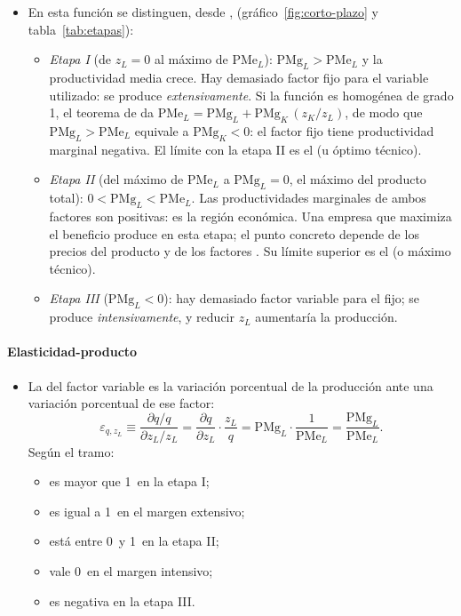 \documentclass[11pt]{article}
\begin{document}
\begin{itemize}
\item En esta función se distinguen, desde \textcite{Cassels1936Law},  (gráfico~\ref{fig:corto-plazo} y tabla~\ref{tab:etapas}):
  \begin{itemize}
  \item \emph{Etapa I} (de $z_L=0$ al máximo de $\mathrm{PMe}_L$): $\mathrm{PMg}_L>\mathrm{PMe}_L$ y la productividad media crece. Hay demasiado factor fijo para el variable utilizado: se produce \emph{extensivamente}. Si la función es homogénea de grado 1, el teorema de  da $\mathrm{PMe}_L=\mathrm{PMg}_L+\mathrm{PMg}_K\,(z_K/z_L)$, de modo que $\mathrm{PMg}_L>\mathrm{PMe}_L$ equivale a $\mathrm{PMg}_K<0$: el factor fijo tiene productividad marginal negativa. El límite con la etapa II es el  (u óptimo técnico).
  \item \emph{Etapa II} (del máximo de $\mathrm{PMe}_L$ a $\mathrm{PMg}_L=0$, el máximo del producto total): $0<\mathrm{PMg}_L<\mathrm{PMe}_L$. Las productividades marginales de ambos factores son positivas: es la región económica. Una empresa que maximiza el beneficio produce en esta etapa; el punto concreto depende de los precios del producto y de los factores  . Su límite superior es el  (o máximo técnico).
  \item \emph{Etapa III} ($\mathrm{PMg}_L<0$): hay demasiado factor variable para el fijo; se produce \emph{intensivamente}, y reducir $z_L$ aumentaría la producción.
  \end{itemize}
\end{itemize}

\paragraph{Elasticidad-producto}

\begin{itemize}
\item La  del factor variable es la variación porcentual de la producción ante una variación porcentual de ese factor:
  \begin{equation}
  \varepsilon_{q,z_L}\equiv\frac{\partial q/q}{\partial z_L/z_L}=\frac{\partial q}{\partial z_L}\cdot\frac{z_L}{q}=\mathrm{PMg}_L\cdot\frac{1}{\mathrm{PMe}_L}=\frac{\mathrm{PMg}_L}{\mathrm{PMe}_L}. \label{eq:elasticidad-producto}
  \end{equation}
  Según el tramo:
  \begin{itemize}
  \item es mayor que 1~en la etapa I;
  \item es igual a 1~en el margen extensivo;
  \item está entre 0~y 1~en la etapa II;
  \item vale 0~en el margen intensivo;
  \item es negativa en la etapa III.
  \end{itemize}
\end{itemize}
\end{document}
